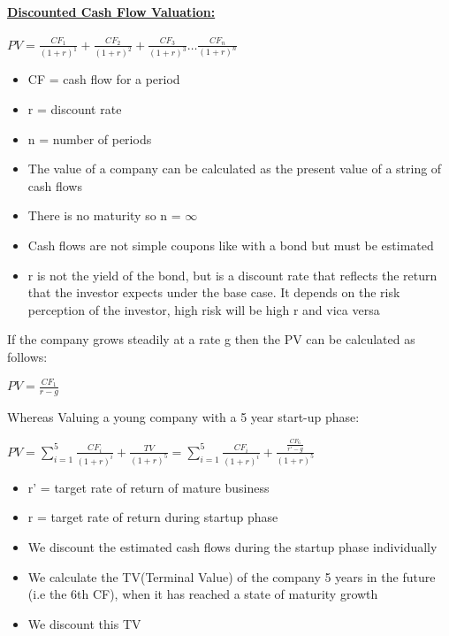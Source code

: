 \documentclass[8pt]{extreport}
\begin{document}
{\paragraph{\underline{Discounted Cash Flow Valuation:}}
\begin{center}
$PV = \frac{CF_{1}}{(1+r)^1} + \frac{CF_{2}}{(1+r)^2} + \frac{CF_{3}}{(1+r)^3} \dots \frac{CF_{n}}{(1+r)^n}$
\end{center}
\begin{itemize}
\item CF = cash flow for a period
\item r = discount rate
\item n = number of periods
\item The value of a company can be calculated as the present value of a string of cash flows
\item There is no maturity so n = $\infty$
\item Cash flows are not simple coupons like with a bond but must be estimated
\item r is not the yield of the bond, but is a discount rate that reflects the return that the investor expects under the base case. It depends on the risk perception of the investor, high risk will be high r and vica versa
\end{itemize}
If the company grows steadily at a rate g then the PV can be calculated as follows:
\begin{center}
$PV = \frac{CF_{1}}{r-g}$
\end{center}
Whereas Valuing a young company with a 5 year start-up phase:\\
\begin{center}
$PV = \displaystyle\sum_{i=1}^{5}\frac{CF_{i}}{(1+r)^i} + \frac{TV}{(1+r)^5} = \displaystyle\sum_{i=1}^{5}\frac{CF_{i}}{(1+r)^i} + \frac{\frac{CF_{6}}{r' - g}}{(1+r)^5}$
\end{center}
\begin{itemize}
\item r' = target rate of return of mature business
\item r = target rate of return during startup phase
\item We discount the estimated cash flows during the startup phase individually
\item We calculate the TV(Terminal Value) of the company 5 years in the future (i.e the 6th CF), when it has reached a state of maturity growth
\item We discount this TV
\end{itemize}
}
\end{document}
